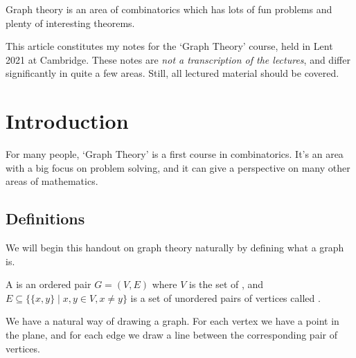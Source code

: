 



Graph theory is an area of combinatorics which has lots of fun problems and plenty of interesting theorems.


This article constitutes my notes for the `Graph Theory' course, held in Lent 2021 at Cambridge. These notes are \emph{not a transcription of the lectures}, and differ significantly in quite a few areas. Still, all lectured material should be covered.








\section{Introduction}

For many people, `Graph Theory' is a first course in combinatorics. It's an area with a big focus on problem solving, and it can give a perspective on many other areas of mathematics.  

\subsection{Definitions}

We will begin this handout on graph theory naturally by defining what a graph is.

\begin{definition}[Graph]
	A  is an ordered pair $G = (V, E)$ where $V$ is the set of , and $E \subseteq \{ \{x,y\} \mid x, y \in V, x \neq y \}$ is a set of unordered pairs of vertices called .
\end{definition}

We have a natural way of drawing a graph. For each vertex we have a point in the plane, and for each edge we draw a line between the corresponding pair of vertices.

